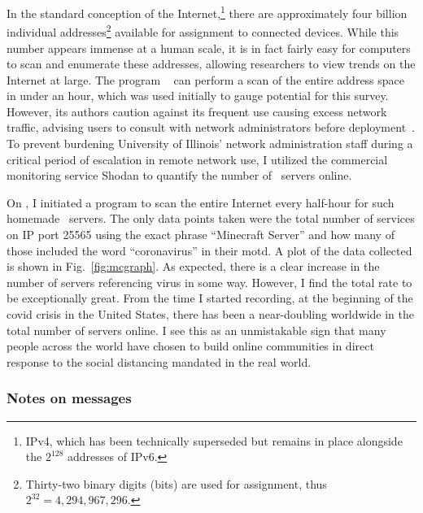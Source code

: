 \documentclass[russian,american]{../../../coursework}
\newcommand{\mc}{\citetitle{Minecraft}}
\begin{document}
In the standard conception of the Internet,\footnote{IPv4, which has been technically superseded
but remains in place alongside the \(2^{128}\) addresses of IPv6.}
there are approximately four billion individual
addresses\footnote{Thirty-two binary digits (bits) are used for assignment, thus
\(2^{32} = 4,294,967,296\).}
available for assignment to connected devices. While this number appears
immense at a human scale, it is in fact fairly easy for computers to scan and
enumerate these addresses, allowing researchers to view trends on the Internet
at large. The program \ \parencite{zmap} can perform a scan of
the entire address space in under an hour, which was used initially to gauge
potential for this survey. However, its authors caution against its frequent use
causing excess network traffic, advising users to consult with network
administrators before deployment~\parencite{zmap-paper}.
To prevent burdening University of Illinois' network administration staff during
a critical period of escalation in remote network use, I utilized the
commercial monitoring service Shodan \parencite{Shodan} to quantify
the number of \mc\ servers online.

On , I initiated a program to scan the
entire Internet every half-hour for such homemade \mc\ servers.
The only data points taken were the total number of services on \ac{IP}
port 25565 using the exact phrase \enquote{Minecraft Server} and how many
of those included the word \enquote{coronavirus} in their \ac{motd}.
A plot of the data collected is shown in Fig.~\ref{fig:mcgraph}. As expected,
there is a clear increase in the number of servers referencing \ac{virus} in some way.
However, I find the total rate to be
exceptionally great. From the time I started recording, at the beginning of the
\ac{covid} crisis in the United States, there has been a near-doubling worldwide
in the total number of servers online. I see this as an unmistakable sign that
many people across the world have chosen to build online communities in direct
response to the social distancing mandated in the real world.

% 	

\subsubsection{Notes on messages}
\end{document}
